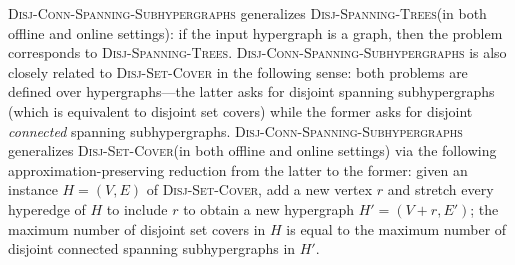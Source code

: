 \documentclass[11pt]{article}
\theoremstyle{definition}
\newcommand{\DSC}{\textsc{Disj-Set-Cover}\xspace}
\newcommand{\DST}{\textsc{Disj-Spanning-Trees}\xspace}
\newcommand{\DCSS}{\textsc{Disj-Conn-Spanning-Subhypergraphs}\xspace}
\begin{document}
\DCSS generalizes \DST (in both offline and online settings): if the input hypergraph is a graph, then the problem corresponds to \DST. 
\DCSS is also closely related to \DSC in the following sense: both problems are defined over hypergraphs---the latter asks for disjoint spanning subhypergraphs (which is equivalent to disjoint set covers) while the former asks for disjoint \emph{connected} spanning subhypergraphs. 
\DCSS generalizes \DSC (in both offline and online settings) via the following approximation-preserving reduction from the latter to the former: given an instance $H=(V, E)$ of \DSC, add a new vertex $r$ and stretch every hyperedge of $H$ to include $r$ to obtain a new hypergraph $H'=(V+r, E')$; the maximum number of disjoint set covers in $H$ is equal to the maximum number of disjoint connected spanning subhypergraphs in $H'$. 
\end{document}
